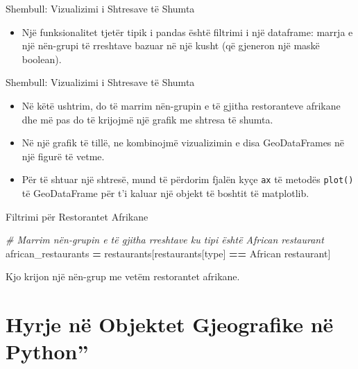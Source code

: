 \documentclass[
  ignorenonframetext,
]{beamer}
\newenvironment{Shaded}{\begin{snugshade}}{\end{snugshade}}
\newcommand{\CommentTok}[1]{\textcolor[rgb]{0.56,0.35,0.01}{\textit{#1}}}
\newcommand{\NormalTok}[1]{#1}
\newcommand{\OperatorTok}[1]{\textcolor[rgb]{0.81,0.36,0.00}{\textbf{#1}}}
\newcommand{\StringTok}[1]{\textcolor[rgb]{0.31,0.60,0.02}{#1}}
\providecommand{\tightlist}{%
  \setlength{\itemsep}{0pt}\setlength{\parskip}{0pt}}
\begin{document}
\begin{frame}{Shembull: Vizualizimi i Shtresave të Shumta}
\protect\hypertarget{shembull-vizualizimi-i-shtresave-tuxeb-shumta}{}
\begin{itemize}
\tightlist
\item
  Një funksionalitet tjetër tipik i pandas është filtrimi i një
  dataframe: marrja e një nën-grupi të rreshtave bazuar në një kusht (që
  gjeneron një maskë boolean).
\end{itemize}
\end{frame}

\begin{frame}[fragile]{Shembull: Vizualizimi i Shtresave të Shumta}
\protect\hypertarget{shembull-vizualizimi-i-shtresave-tuxeb-shumta-1}{}
\begin{itemize}
\item
  Në këtë ushtrim, do të marrim nën-grupin e të gjitha restoranteve
  afrikane dhe më pas do të krijojmë një grafik me shtresa të shumta.
\item
  Në një grafik të tillë, ne kombinojmë vizualizimin e disa
  GeoDataFrames në një figurë të vetme.
\item
  Për të shtuar një shtresë, mund të përdorim fjalën kyçe \texttt{ax} të
  metodës \texttt{plot()} të GeoDataFrame për t'i kaluar një objekt të
  boshtit të matplotlib.
\end{itemize}
\end{frame}

\begin{frame}[fragile]{Filtrimi për Restorantet Afrikane}
\protect\hypertarget{filtrimi-puxebr-restorantet-afrikane}{}

\begin{Shaded}
\begin{Highlighting}[]
\CommentTok{\# Marrim nën{-}grupin e të gjitha rreshtave ku tipi është \textquotesingle{}African restaurant\textquotesingle{}}
\NormalTok{african\_restaurants }\OperatorTok{=}\NormalTok{ restaurants[restaurants[}\StringTok{\textquotesingle{}type\textquotesingle{}}\NormalTok{] }\OperatorTok{==} \StringTok{\textquotesingle{}African restaurant\textquotesingle{}}\NormalTok{]}
\end{Highlighting}
\end{Shaded}

Kjo krijon një nën-grup me vetëm restorantet afrikane.
\end{frame}

\hypertarget{hyrje-nuxeb-objektet-gjeografike-nuxeb-python}{%
\section{Hyrje në Objektet Gjeografike në
Python''}\label{hyrje-nuxeb-objektet-gjeografike-nuxeb-python}}
\end{document}
